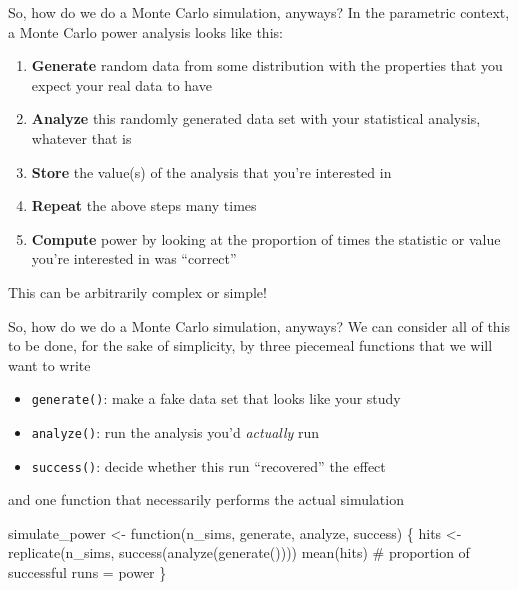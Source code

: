 \documentclass[
  ignorenonframetext,
  aspectratio=169,
]{beamer}
\newenvironment{Shaded}{\begin{snugshade}}{\end{snugshade}}
\newcommand{\CommentTok}[1]{\textcolor[rgb]{0.37,0.37,0.37}{#1}}
\newcommand{\ControlFlowTok}[1]{\textcolor[rgb]{0.00,0.23,0.31}{#1}}
\newcommand{\FunctionTok}[1]{\textcolor[rgb]{0.28,0.35,0.67}{#1}}
\newcommand{\NormalTok}[1]{\textcolor[rgb]{0.00,0.23,0.31}{#1}}
\newcommand{\OtherTok}[1]{\textcolor[rgb]{0.00,0.23,0.31}{#1}}
\providecommand{\tightlist}{%
  \setlength{\itemsep}{0pt}\setlength{\parskip}{0pt}}\usepackage{longtable,booktabs,array}
\begin{document}
\begin{frame}{So, how do we do a Monte Carlo simulation, anyways?}
\label{so-how-do-we-do-a-monte-carlo-simulation-anyways}
In the parametric context, a Monte Carlo power analysis looks like this:

\begin{enumerate}
\tightlist
\item
  \textbf{Generate} random data from some distribution with the
  properties that you expect your real data to have
\item
  \textbf{Analyze} this randomly generated data set with your
  statistical analysis, whatever that is
\item
  \textbf{Store} the value(s) of the analysis that you're interested in
\item
  \textbf{Repeat} the above steps many times
\item
  \textbf{Compute} power by looking at the proportion of times the
  statistic or value you're interested in was ``correct''
\end{enumerate}

\vskip20pt

\begin{center}
This can be arbitrarily complex or simple!
\end{center}
\end{frame}

\begin{frame}[fragile]{So, how do we do a Monte Carlo simulation,
anyways?}
\label{so-how-do-we-do-a-monte-carlo-simulation-anyways-1}
We can consider all of this to be done, for the sake of simplicity, by
three piecemeal functions that we will want to write

\begin{itemize}
\tightlist
\item
  \texttt{generate()}: make a fake data set that looks like your study
\item
  \texttt{analyze()}: run the analysis you'd \emph{actually} run
\item
  \texttt{success()}: decide whether this run ``recovered'' the effect
\end{itemize}

and one function that necessarily performs the actual simulation

\begin{Shaded}
\begin{Highlighting}[]
\NormalTok{simulate\_power }\OtherTok{\textless{}{-}} \ControlFlowTok{function}\NormalTok{(n\_sims, generate, analyze, success) \{}
\NormalTok{    hits }\OtherTok{\textless{}{-}} \FunctionTok{replicate}\NormalTok{(n\_sims, }\FunctionTok{success}\NormalTok{(}\FunctionTok{analyze}\NormalTok{(}\FunctionTok{generate}\NormalTok{())))}
    \FunctionTok{mean}\NormalTok{(hits) }\CommentTok{\# proportion of successful runs = power}
\NormalTok{\}}
\end{Highlighting}
\end{Shaded}
\end{frame}
\end{document}
